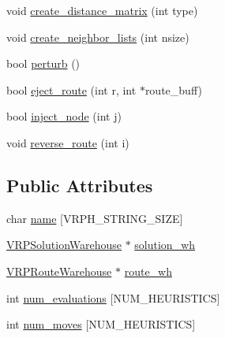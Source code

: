 \begin{DoxyCompactItemize}
\item 
void \hyperlink{class_v_r_p_af29c214351fe56211ead2ffbb88704b0}{create\_\-distance\_\-matrix} (int type)
\item 
void \hyperlink{class_v_r_p_ad130cf735469fba7515836247a4666bc}{create\_\-neighbor\_\-lists} (int nsize)
\item 
bool \hyperlink{class_v_r_p_a2eea5225f0f8f9756bfeac54cd8371b9}{perturb} ()
\item 
bool \hyperlink{class_v_r_p_a094295c8278aa30ec623750dd6830b3b}{eject\_\-route} (int r, int $\ast$route\_\-buff)
\item 
bool \hyperlink{class_v_r_p_abc1fa45b42d0fc00f9465ad1be62fd2c}{inject\_\-node} (int j)
\item 
void \hyperlink{class_v_r_p_ac16a3bfc6dd90097231615e74c365e99}{reverse\_\-route} (int i)
\end{DoxyCompactItemize}
\subsection*{Public Attributes}
\begin{DoxyCompactItemize}
\item 
char \hyperlink{class_v_r_p_af9d32e74c8941ce1ae12fdb057350dc3}{name} \mbox{[}VRPH\_\-STRING\_\-SIZE\mbox{]}
\item 
\hyperlink{class_v_r_p_solution_warehouse}{VRPSolutionWarehouse} $\ast$ \hyperlink{class_v_r_p_a858342764727f7bea3c965b4e9fb3dfa}{solution\_\-wh}
\item 
\hyperlink{class_v_r_p_route_warehouse}{VRPRouteWarehouse} $\ast$ \hyperlink{class_v_r_p_a57c6657f57f74ec450a59d277706dfd6}{route\_\-wh}
\item 
int \hyperlink{class_v_r_p_a5adda95e03e133206d5fbcdf742954e0}{num\_\-evaluations} \mbox{[}NUM\_\-HEURISTICS\mbox{]}
\item 
int \hyperlink{class_v_r_p_ad2c3d755cc77b47e448d0c40dedaf4f2}{num\_\-moves} \mbox{[}NUM\_\-HEURISTICS\mbox{]}
\end{DoxyCompactItemize}
